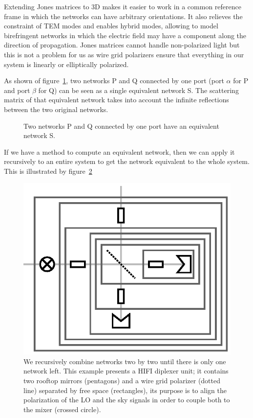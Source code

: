\documentclass[a4paper,11pt]{article}
\begin{document}
Extending Jones matrices to 3D makes it easier to work in a common reference frame in which the networks can have arbitrary orientations.
It also relieves the constraint of TEM modes and enables hybrid modes, allowing to model birefringent networks in which the electric field may have a component along the direction of propagation.
Jones matrices cannot handle non-polarized light but this is not a problem for us as wire grid polarizers ensure that everything in our system is linearly or elliptically polarized.

As shown of figure~\ref{fig:cascading}, two networks P and Q connected by one port (port $\alpha$ for P and port $\beta$ for Q) can be seen as a single equivalent  network S.
The scattering matrix of that equivalent network takes into account the infinite reflections between the two original networks.
\begin{figure}[hbtp]
    \centering
    
    \caption{\label{fig:cascading}Two networks P and Q connected by one port have an equivalent network S.}
\end{figure}

If we have a method to compute an equivalent network, then we can apply it recursively to an entire system to get the network equivalent to the whole system.
This is illustrated by figure~\ref{fig:cascading_example}
\begin{figure}[hbtp]
    \centering
    \includegraphics{cascading_example}
    \caption{\label{fig:cascading_example}
    We recursively combine networks two by two until there is only one network left.
    This example presents a HIFI diplexer unit; it contains two rooftop mirrors (pentagons) and a wire grid polarizer (dotted line) separated by free space (rectangles), its purpose is to align the polarization of the LO and the sky signals in order to couple both to the mixer (crossed circle).
    }
\end{figure}
\end{document}
